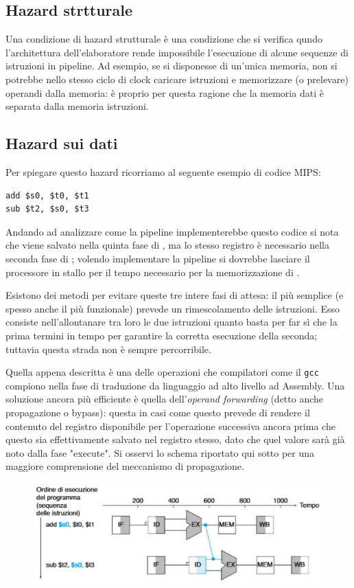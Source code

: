 \documentclass[class=book, crop=false, oneside]{standalone}
\begin{document}
\subsection{Hazard strtturale}
Una condizione di hazard strutturale è una condizione che si verifica qundo l'architettura dell’elaboratore rende impossibile l’esecuzione di alcune sequenze di istruzioni in pipeline. Ad esempio, se si disponesse di un'unica memoria, non si potrebbe nello stesso ciclo di clock caricare istruzioni e memorizzare (o prelevare) operandi dalla memoria: è proprio per questa ragione che la memoria dati è separata dalla memoria istruzioni.

\subsection{Hazard sui dati}
Per spiegare questo hazard ricorriamo al seguente esempio di codice MIPS:
\begin{verbatim}
add $s0, $t0, $t1
sub $t2, $s0, $t3
\end{verbatim}
Andando ad analizzare come la pipeline implementerebbe questo codice si nota che  viene salvato nella quinta fase di , ma lo stesso registro è necessario nella seconda fase di ; volendo implementare la pipeline si dovrebbe lasciare il processore in stallo per il tempo necessario per la memorizzazione di .

Esistono dei metodi per evitare queste tre intere fasi di attesa: il più semplice (e spesso anche il più funzionale) prevede un rimescolamento delle istruzioni. Esso consiste nell'allontanare tra loro le due istruzioni quanto basta per far sì che la prima termini in tempo per garantire la corretta esecuzione della seconda; tuttavia questa strada non è sempre percorribile.

Quella appena descritta è una delle operazioni che compilatori come il \texttt{gcc} compiono nella fase di traduzione da linguaggio ad alto livello ad Assembly. Una soluzione ancora più efficiente è quella dell'\emph{operand forwarding} (detto anche propagazione o bypass): questa in casi come questo prevede di rendere il contenuto del registro  disponibile per l'operazione successiva ancora prima che questo sia effettivamente salvato nel registro stesso, dato che quel valore sarà già noto dalla fase "execute".
Si osservi lo schema riportato qui sotto per una maggiore comprensione del meccanismo di propagazione.
\begin{figure}
	\centering
	\includegraphics[width=.8\textwidth,keepaspectratio]{propagazione.png}
\end{figure}
\end{document}
